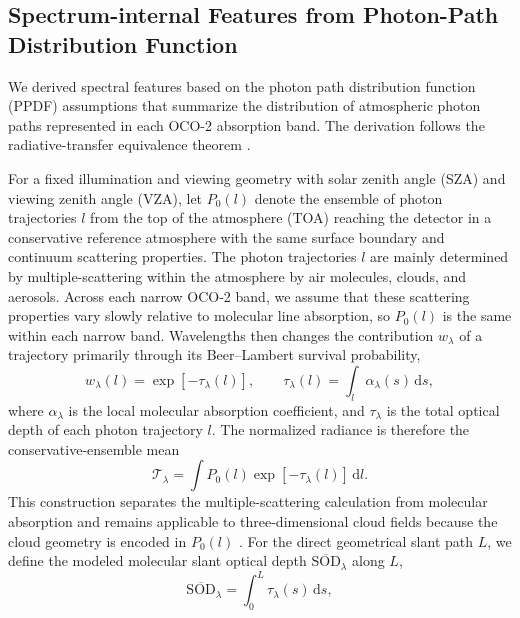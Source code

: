 \subsection{Spectrum-internal Features from Photon-Path Distribution Function}
\label{sec:methods_photon_path}


We derived spectral features based on the photon path distribution function (PPDF) assumptions that summarize the distribution of atmospheric
photon paths represented in each OCO-2 absorption band. The derivation follows
the radiative-transfer equivalence theorem
\citep{irvine1964,partain2000,stephens2000}. 


For a fixed illumination and viewing geometry with solar zenith angle (SZA) and viewing zenith angle (VZA), let $P_0(l)$ denote the ensemble of photon trajectories $l$ from the top of the atmosphere (TOA) reaching the detector in a conservative reference atmosphere with the same surface boundary and continuum scattering properties. The photon trajectories $l$ are mainly determined by multiple-scattering within the atmosphere by air molecules, clouds, and aerosols. Across each narrow OCO-2 band, we assume that these scattering properties vary slowly relative to molecular line absorption, so $P_0(l)$ is the same within each narrow band.  Wavelengths then changes the contribution $w_\lambda$ of a trajectory primarily through its Beer--Lambert survival probability,
%
\begin{equation}
  w_\lambda(l)
  = \exp[-\tau_\lambda(l)],
  \qquad
  \tau_\lambda(l)
  = \int_{l} \alpha_\lambda(s)\,\mathrm{d}s,
  \label{eq:main_path_weight}
\end{equation}
%
where $\alpha_\lambda$ is the local molecular absorption coefficient, and $\tau_\lambda$ is the total optical depth of each photon trajectory $l$.  The
normalized radiance is therefore the conservative-ensemble mean
%
\begin{equation}
  \mathcal T_\lambda
  = \int P_0(l)
      \exp[-\tau_\lambda(l)]\,\mathrm{d}l.
  \label{eq:main_equivalence}
\end{equation}
%
This construction separates the multiple-scattering calculation from molecular
absorption and remains applicable to three-dimensional cloud fields because the
cloud geometry is encoded in $P_0(l)$ \citep{stephens2000}.
%
%
%
For the direct geometrical slant path $L$, we define the modeled molecular slant optical depth $\mathrm{\overline{SOD}}_\lambda$ along $L$,
%
\begin{equation}
  \mathrm{\overline{SOD}}_\lambda
  = \int_0^{L} \tau_\lambda(s)\,\mathrm{d}s,
  \label{eq:main_SOD}
\end{equation}
%

